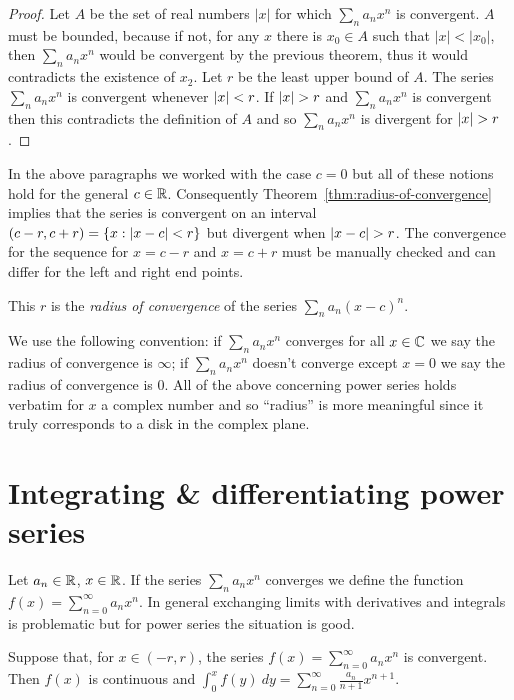 \begin{proof}
  Let \(A\) be the set of real numbers $|x|$ for which \(\sum_n a_n x^n\) is convergent.
  $A$ must be bounded, because if not, for any $x$ there is $x_0 \in A$ such that $|x| < |x_0|$,
  then $\sum_n a_n x^n$ would be convergent by the previous theorem, thus it would contradicts the existence of $x_2$.
  Let \(r\) be the least upper bound of \(A\).
  The series  \(\sum_n a_n x^n\) is convergent whenever \(\left|x\right|<r\).
  If \(\abs{x}>r\) and \(\sum_n a_n x^n\) is convergent then this contradicts the definition of \(A\) and so  \(\sum_n a_n x^n\) is divergent for \(\abs{x}>r\).
\end{proof}

In the above paragraphs we worked with the case \(c=0\) but all of these notions hold for the general \(c\in \mathbb{R}\). Consequently Theorem~\ref{thm:radius-of-convergence} implies that the series is convergent on an interval \((c-r,c+r) = \{x:\left|x-c\right|<r\}\) but divergent when \(\abs{x-c}>r\).
The convergence for the sequence for \(x=c-r\) and \(x=c+r\) must be manually checked and can differ for the left and right end points.

\begin{definition}
  This \(r\) is the \emph{radius of convergence} of the series \(\sum_n a_n {(x-c)}^n\).
\end{definition}

We use the following convention:
if \(\sum_n a_n x^n\) converges for all \(x\in \mathbb{C}\) we say the radius of convergence is \(\infty\);
if \(\sum_n a_n x^n\) doesn't converge except  \(x=0\) we say the radius of convergence is \(0\).
All of the above concerning power series holds verbatim for \(x\) a complex number and so ``radius'' is more meaningful since it truly corresponds to a disk in the complex plane.




\section{Integrating \& differentiating power series}

Let \(a_n \in \mathbb{R}\), \(x\in \mathbb{R}\).
If the series \(\sum_n a_n x^n\) converges we define the function \(f(x) = \sum_{n=0}^{\infty} a_n x^n\).
In general exchanging limits with derivatives and integrals is problematic but for power series the situation is good.

\begin{theorem}%
  \label{thm:integrate-power}
  Suppose that, for \(x\in (-r,r)\), the series  \(f(x) = \sum_{n=0}^{\infty} a_n x^n\) is convergent.
  Then \(f(x)\) is continuous and \(\int_0^x f(y) \ dy = \sum_{n=0}^{\infty} \frac{a_n}{n+1} x^{n+1}\).
\end{theorem}


